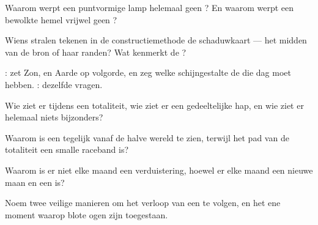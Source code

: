 \begin{exercise}[$\star$]\label{exo:g7:shadows-eclipses:2}
Waarom werpt een puntvormige lamp helemaal geen ? En
waarom werpt een bewolkte hemel vrijwel geen ?
\end{exercise}

\begin{exercise}[$\star$]\label{exo:g7:shadows-eclipses:3}
Wiens stralen tekenen in de constructiemethode de schaduwkaart --- het
midden van de bron of haar randen? Wat kenmerkt de
?
\end{exercise}

\begin{exercise}[$\star$]\label{exo:g7:shadows-eclipses:4}
: zet Zon,  en Aarde op volgorde, en zeg welke
schijngestalte de  die dag moet hebben.
: dezelfde vragen.
\end{exercise}

\begin{exercise}[$\star$]\label{exo:g7:shadows-eclipses:5}
Wie ziet er tijdens een  totaliteit, wie ziet er een
gedeeltelijke hap, en wie ziet er helemaal niets bijzonders?
\end{exercise}

\begin{exercise}[$\star$]\label{exo:g7:shadows-eclipses:6}
Waarom is een  tegelijk vanaf de halve wereld te
zien, terwijl het pad van de totaliteit een smalle raceband is?
\end{exercise}

\begin{exercise}[$\star$]\label{exo:g7:shadows-eclipses:7}
Waarom is er niet elke maand een verduistering, hoewel er elke maand
een nieuwe maan en een  is?
\end{exercise}

\begin{exercise}[$\star$]\label{exo:g7:shadows-eclipses:8}
Noem twee veilige manieren om het verloop van een
 te volgen, en het ene moment waarop blote ogen
zijn toegestaan.
\end{exercise}


